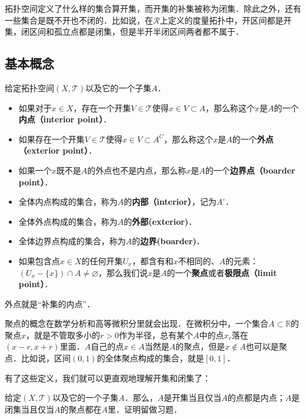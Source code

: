 拓扑空间定义了什么样的集合算开集，而开集的补集被称为闭集．除此之外，还有一些集合是既不开也不闭的．比如说，在$\mathcal{R}$上定义的度量拓扑中，开区间都是开集，闭区间和孤立点都是闭集，但是半开半闭区间两者都不属于．

\subsection{基本概念}
\begin{definition}{}
给定拓扑空间$(X, \mathcal{T})$以及它的一个子集$A$．
\begin{itemize}
\item 如果对于$x\in X$，存在一个开集$V\in \mathcal{T}$使得$x\in V\subset A$，那么称这个$x$是$A$的一个\textbf{内点（interior point）}．
\item 如果存在一个开集$V\in \mathcal{T}$使得$x\in V\subset A^C$，那么称这个$x$是$A$的一个\textbf{外点（exterior point）}．
\item 如果一个$x$既不是$A$的外点也不是内点，那么称$x$是$A$的一个\textbf{边界点（boarder point）}．

\item 全体内点构成的集合，称为$A$的\textbf{内部（interior）}，记为$A^\circ$．
\item 全体外点构成的集合，称为$A$的\textbf{外部(exterior)}．
\item 全体边界点构成的集合，称为$A$的\textbf{边界(boarder)}．
\item 如果包含点$x\in X$的任何开集$U_x$，都含有和$x$不相同的、$A$的元素：$(U_x-\{x\})\cap A\not=\varnothing$，那么我们说$x$是$A$的一个\textbf{聚点}或者\textbf{极限点（limit point）}．
\end{itemize}
\end{definition}

外点就是“补集的内点”．

聚点的概念在数学分析和高等微积分里就会出现．在微积分中，一个集合$A\subset\mathbb{R}$的聚点$x$，就是不管取多小的$r>0$作为半径，总有某个$A$中的点$x_r$落在$(x-r, x+r)$里面．$A$自己的点$x\in A$当然是$A$的聚点，但是$x\not\in A$也可以是聚点．比如说，区间$(0,1)$的全体聚点构成的集合，就是$[0,1]$．

有了这些定义，我们就可以更直观地理解开集和闭集了：

\begin{exercise}{}\label{Topo0_exe1}
给定$(X, \mathcal{T})$以及它的一个子集$A$．那么，$A$是开集当且仅当$A$的点都是内点；$A$是闭集当且仅当$A$的聚点都在$A$里．证明留做习题．
\end{exercise}

